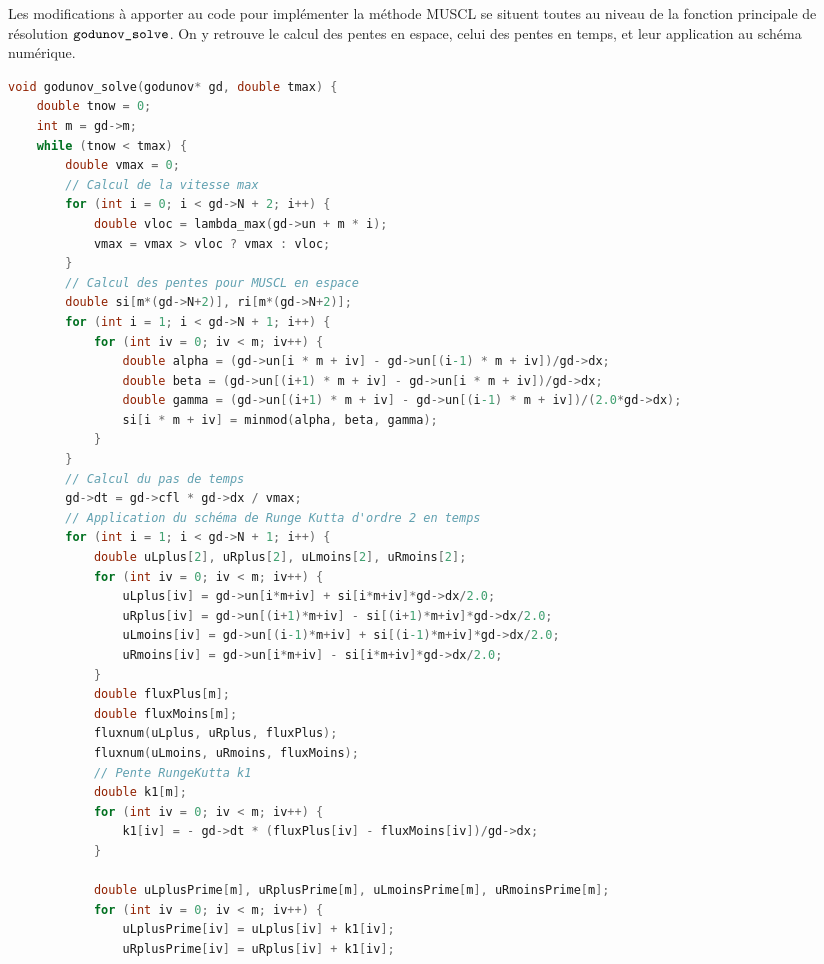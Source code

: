 \documentclass[
	french,
	11pt, %
]{fphw}
\begin{document}
\noindent Les modifications à apporter au code pour implémenter la méthode MUSCL se situent toutes au niveau de la fonction principale de résolution $\verb|godunov_solve|$. On y retrouve le calcul des pentes en espace, celui des pentes en temps, et leur application au schéma numérique.

\begin{lstlisting}[language=C, caption={Application de la correction MUSCL en espace, et d'un schéma de Runge-Kutta d'ordre 2 en temps. La fonction "fluxnum" observée correspond au flux VFRoe sans correction entropique.},breaklines]
void godunov_solve(godunov* gd, double tmax) {
    double tnow = 0;
    int m = gd->m;
    while (tnow < tmax) {
        double vmax = 0;
        // Calcul de la vitesse max
        for (int i = 0; i < gd->N + 2; i++) {
            double vloc = lambda_max(gd->un + m * i);
            vmax = vmax > vloc ? vmax : vloc;
        }
        // Calcul des pentes pour MUSCL en espace
        double si[m*(gd->N+2)], ri[m*(gd->N+2)];
        for (int i = 1; i < gd->N + 1; i++) {
            for (int iv = 0; iv < m; iv++) {
                double alpha = (gd->un[i * m + iv] - gd->un[(i-1) * m + iv])/gd->dx;
                double beta = (gd->un[(i+1) * m + iv] - gd->un[i * m + iv])/gd->dx;
                double gamma = (gd->un[(i+1) * m + iv] - gd->un[(i-1) * m + iv])/(2.0*gd->dx);
                si[i * m + iv] = minmod(alpha, beta, gamma);
            }   
        }
		// Calcul du pas de temps
        gd->dt = gd->cfl * gd->dx / vmax;
		// Application du schéma de Runge Kutta d'ordre 2 en temps
        for (int i = 1; i < gd->N + 1; i++) {            
            double uLplus[2], uRplus[2], uLmoins[2], uRmoins[2];
            for (int iv = 0; iv < m; iv++) {
                uLplus[iv] = gd->un[i*m+iv] + si[i*m+iv]*gd->dx/2.0;
                uRplus[iv] = gd->un[(i+1)*m+iv] - si[(i+1)*m+iv]*gd->dx/2.0;
                uLmoins[iv] = gd->un[(i-1)*m+iv] + si[(i-1)*m+iv]*gd->dx/2.0;
                uRmoins[iv] = gd->un[i*m+iv] - si[i*m+iv]*gd->dx/2.0;
            }
            double fluxPlus[m];
            double fluxMoins[m];
            fluxnum(uLplus, uRplus, fluxPlus);
			fluxnum(uLmoins, uRmoins, fluxMoins);
			// Pente RungeKutta k1
            double k1[m]; 
            for (int iv = 0; iv < m; iv++) {
                k1[iv] = - gd->dt * (fluxPlus[iv] - fluxMoins[iv])/gd->dx;
            }

            double uLplusPrime[m], uRplusPrime[m], uLmoinsPrime[m], uRmoinsPrime[m];
            for (int iv = 0; iv < m; iv++) {
                uLplusPrime[iv] = uLplus[iv] + k1[iv];
                uRplusPrime[iv] = uRplus[iv] + k1[iv];


\end{lstlisting}
\end{document}
